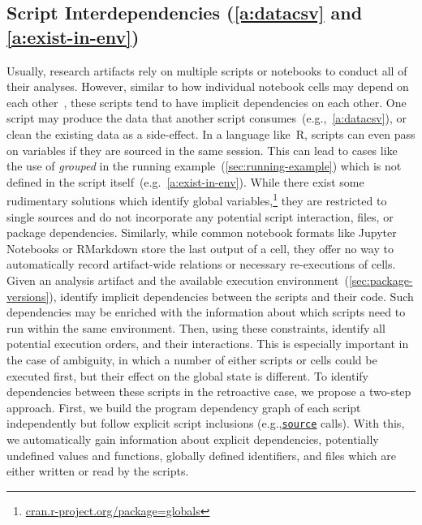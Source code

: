 \subsection[Script Interdependencies]{Script Interdependencies (\ref{a:datacsv} and \ref{a:exist-in-env})}\label{sec:script-interdependencies}
Usually, research artifacts rely on multiple scripts or notebooks to conduct all of their analyses. However, similar to how individual notebook cells may depend on each other~\cite{DBLP:conf/chi/HeadHBDD19}, these scripts tend to have implicit dependencies on each other. One script may produce the data that another script consumes~(e.g.,~\ref{a:datacsv}), or clean the existing data as a side-effect. In a language like~R, scripts can even pass on variables if they are sourced in the same session. This can lead to cases like the use of \textit{grouped} in the running example~(\ref{sec:running-example}) which is not defined in the script itself~(e.g.~\ref{a:exist-in-env}). %
While there exist some rudimentary solutions which identify global variables,\footnote{\href{https://cran.r-project.org/package=globals}{cran.r-project.org/package=globals}} they are restricted to single sources and do not incorporate any potential script interaction, files, or package dependencies.
Similarly, while common notebook formats like Jupyter Notebooks or RMarkdown store the last output of a cell, they offer no way to automatically record artifact-wide relations or necessary re-executions of cells.
Given an analysis artifact and the available execution environment~(\ref{sec:package-versions}), identify implicit dependencies between the scripts and their code.
Such dependencies may be enriched with the information about which scripts need to run within the same environment. %
Then, using these constraints, identify all potential execution orders, and their interactions. This is especially important in the case of ambiguity, in which a number of either scripts or cells could be executed first, but their effect on the global state is different. 
To identify dependencies between these scripts in the retroactive case, we propose a two-step approach. First, we build the program dependency graph of each script independently but follow explicit script inclusions (e.g.,\href{https://www.rdocumentation.org/packages/base/versions/3.6.2/topics/source}{\texttt{source}} calls).
With this, we automatically gain information about explicit dependencies, potentially undefined values and functions, globally defined identifiers, and files which are either written or read by the scripts.
